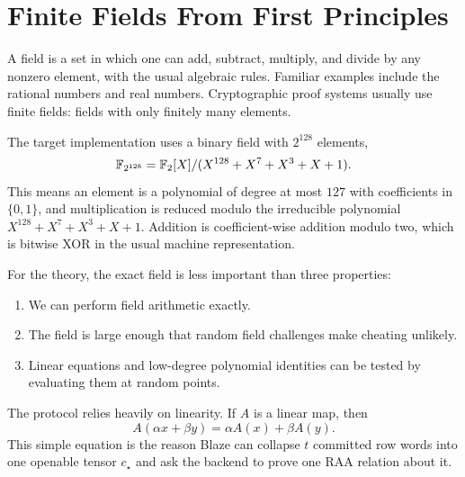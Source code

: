 \section{Finite Fields From First Principles}

A field is a set in which one can add, subtract, multiply, and divide by any
nonzero element, with the usual algebraic rules.  Familiar examples include the
rational numbers and real numbers.  Cryptographic proof systems usually use
finite fields: fields with only finitely many elements.

The target implementation uses a binary field with $2^{128}$ elements,
\[
  \mathbb{F}_{2^{128}}
  =
  \mathbb{F}_2[X]/(X^{128}+X^7+X^3+X+1).
\]
This means an element is a polynomial of degree at most $127$ with coefficients
in $\{0,1\}$, and multiplication is reduced modulo the irreducible polynomial
$X^{128}+X^7+X^3+X+1$.  Addition is coefficient-wise addition modulo two, which
is bitwise XOR in the usual machine representation.

For the theory, the exact field is less important than three properties:

\begin{enumerate}[label=\textbf{F\arabic*.}]
  \item We can perform field arithmetic exactly.
  \item The field is large enough that random field challenges make cheating
        unlikely.
  \item Linear equations and low-degree polynomial identities can be tested by
        evaluating them at random points.
\end{enumerate}

The protocol relies heavily on linearity.  If $A$ is a linear map, then
\[
  A(\alpha x+\beta y)=\alpha A(x)+\beta A(y).
\]
This simple equation is the reason Blaze can collapse $t$ committed row words
into one openable tensor $c_\star$ and ask the backend to prove one RAA
relation about it.

